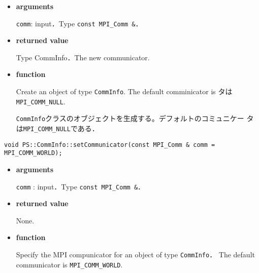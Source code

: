 \begin{itemize}

\item{\bf arguments}

{\tt comm}: input．Type {\tt const MPI\_Comm \&}．

\item {\bf returned value}

Type CommInfo．The new communicator.

\item {\bf function}

Create an object of type {\tt CommInfo}.
The default comminicator is タは{\tt MPI\_COMM\_NULL}.

{\tt CommInfo}クラスのオブジェクトを生成する。デフォルトのコミュニケー
タは{\tt MPI\_COMM\_NULL}である．







\end{itemize}

\begin{screen}
\begin{verbatim}
void PS::CommInfo::setCommunicator(const MPI_Comm & comm = MPI_COMM_WORLD);
\end{verbatim}
\end{screen}

\begin{itemize}

\item{\bf arguments}

{\tt comm} : input．Type {\tt const MPI\_Comm \&}．

\item {\bf returned value}

None.

\item {\bf function}

Specify the MPI compunicator for an object of type {\tt CommInfo}．
The default communicator is {\tt MPI\_COMM\_WORLD}.








\end{itemize}

